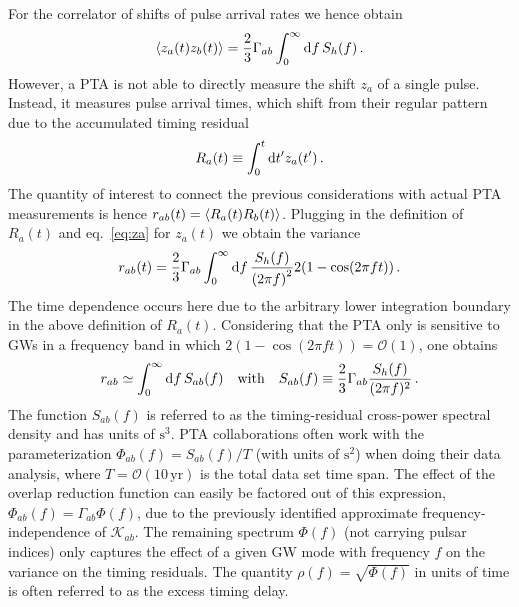 For the correlator of shifts of pulse arrival rates we hence obtain
\begin{align}
	\langle z_a(t) z_b(t) \rangle = \frac{2}{3} \Gamma_{ab} \int_0^\infty \mathop{}\!\mathrm{d} f \, S_h(f) \, .
\end{align}
However, a \ac{PTA}  is not able to directly measure the shift $z_a$ of a single pulse. Instead, it measures pulse arrival times, which shift from their regular pattern due to the  accumulated timing residual
\begin{align}
	R_a(t) \equiv \int_0^t \mathop{}\!\mathrm{d} t^\prime z_a(t^\prime) \label{eq:tresidual} \, .
\end{align}
The quantity of interest to connect the previous considerations with actual \ac{PTA} measurements is hence $r_{ab}(t) = \langle R_a(t) R_b(t) \rangle$. Plugging in the definition of $R_a(t)$ and eq.~\eqref{eq:za} for $z_a(t)$ we obtain the variance
\begin{align}
	r_{ab}(t) =  \frac{2}{3} \Gamma_{ab} \int_0^\infty \mathop{}\!\mathrm{d} f \,\frac{ S_h(f)}{\left( 2 \pi f \right)^2} 2 (1 - \cos (2 \pi f t)) \, .
\end{align}
The time dependence occurs here due to the arbitrary lower integration boundary in the above definition of $R_a(t)$. Considering that the \ac{PTA} only is sensitive to \acp{GW} in a frequency band in which $2 (1 - \cos (2 \pi f t)) = \mathcal{O}(1)$, one obtains~\cite{Maggiore:2018sht}
\begin{align}
	r_{ab} \simeq \int_{0}^{\infty} \mathop{}\!\mathrm{d} f \, S_{ab}(f) \quad \text{with} \quad S_{ab}(f) \equiv \frac{2}{3} \Gamma_{ab}  \frac{S_h(f)}{(2 \pi f)^2} \, .
\end{align}
The function $S_{ab}(f)$ is referred to as the  timing-residual cross-power spectral density and has units of $\text{s}^3$. \ac{PTA} collaborations often work with the parameterization $\Phi_{ab}(f) = S_{ab}(f)/T$ (with units of $\text{s}^2$) when doing their data analysis, where $T = \mathcal{O}(10 \, \text{yr})$ is the total data set time span. The effect of the overlap reduction function can easily be factored out of this expression, $\Phi_{ab}(f) = \Gamma_{ab} \Phi(f)$,  due to the previously identified approximate frequency-independence of $\mathcal{K}_{ab}$. The remaining spectrum $\Phi(f)$ (not carrying pulsar indices) only captures the effect of a given \ac{GW} mode with frequency $f$ on the variance on the timing residuals. The quantity $\rho(f) = \sqrt{\Phi(f)}$ in units of time is often referred to as the excess timing delay.

